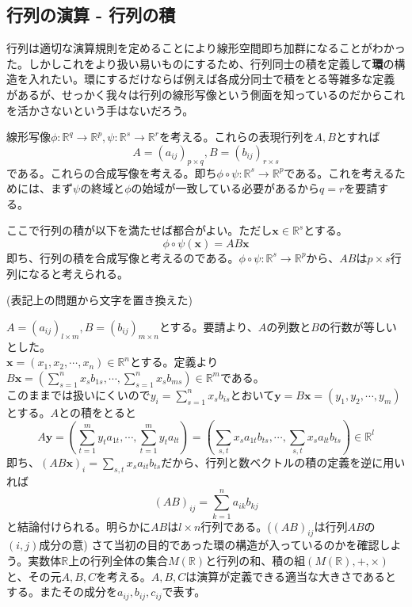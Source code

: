 \documentclass[dvipdfmx]{jsarticle}
\begin{document}
\subsection{行列の演算 - 行列の積}
\motiv 行列は適切な演算規則を定めることにより線形空間即ち加群になることがわかった。しかしこれをより扱い易いものにするため、行列同士の積を定義して\textbf{環}の構造を入れたい。環にするだけならば例えば各成分同士で積をとる等雑多な定義があるが、せっかく我々は行列の線形写像という側面を知っているのだからこれを活かさないという手はないだろう。\par
線形写像$\phi:\mathbb{R}^q\to\mathbb{R}^p, \psi:\mathbb{R}^s\to\mathbb{R}^r$を考える。これらの表現行列を$A,B$とすれば
\[A=(a_{ij})_{p \times q}, B=(b_{ij})_{r \times s}\]
である。これらの合成写像を考える。即ち$\phi\circ\psi:\mathbb{R}^s\to\mathbb{R}^p$である。これを考えるためには、まず$\psi$の終域と$\phi$の始域が一致している必要があるから$q=r$を要請する。\par
ここで行列の積が以下を満たせば都合がよい。ただし$\bm{x}\in\mathbb{R}^s$とする。
\[\phi\circ\psi(\bm{x})=AB\bm{x}\]
即ち、行列の積を合成写像と考えるのである。$\phi\circ\psi:\mathbb{R}^s\to\mathbb{R}^p$から、$AB$は$p \times s$行列になると考えられる。\\\par
\Build(表記上の問題から文字を置き換えた)\vspace{3pt}\par
$A=(a_{ij})_{l \times m}, B=(b_{ij})_{m \times n}$とする。要請より、$A$の列数と$B$の行数が等しいとした。\\
$\bm{x}=(x_1,x_2,\cdots,x_n)\in\mathbb{R}^n$とする。定義より$B\bm{x}=(\displaystyle\sum_{s=1}^nx_sb_{1s},\cdots,\displaystyle\sum_{s=1}^nx_sb_{ms})\in\mathbb{R}^m$である。\\
このままでは扱いにくいので$y_i=\displaystyle\sum_{s=1}^nx_sb_{is}$とおいて$\bm{y}=B\bm{x}=(y_1,y_2,\cdots,y_m)$とする。$A$との積をとると\\
\[A\bm{y}=(\sum_{t=1}^my_ta_{1t},\cdots,\sum_{t=1}^my_ta_{lt})=(\sum_{s,t}x_sa_{1t}b_{ts},\cdots,\sum_{s,t}x_sa_{lt}b_{ts})\in\mathbb{R}^l\]
即ち、$(AB\bm{x})_i=\displaystyle\sum_{s,t}x_sa_{it}b_{ts}$だから、行列と数ベクトルの積の定義を逆に用いれば
\[(AB)_{ij}=\sum_{k=1}^na_{ik}b_{kj}\]
と結論付けられる。明らかに$AB$は$l \times n$行列である。($(AB)_{ij}$は行列$AB$の$(i,j)$成分の意)\newpage
さて当初の目的であった環の構造が入っているのかを確認しよう。実数体$\mathbb{R}$上の行列全体の集合$M(\mathbb{R})$と行列の和、積の組$(M(\mathbb{R}),+,\times)$と、その元$A,B,C$を考える。$A,B,C$は演算が定義できる適当な大きさであるとする。またその成分を$a_{ij},b_{ij},c_{ij}$で表す。\\\par
\end{document}
